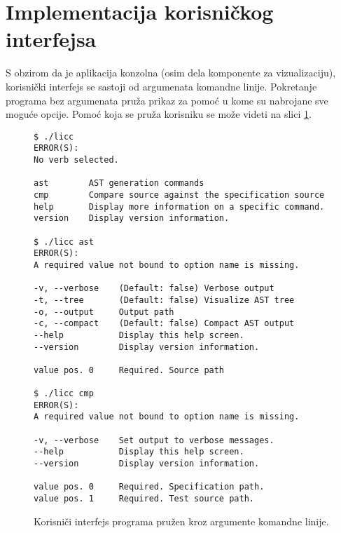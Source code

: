 \section{Implementacija korisničkog interfejsa}
\label{sec:ImplementationUI}

S obzirom da je aplikacija konzolna (osim dela komponente za vizualizaciju), korisnički interfejs se sastoji od argumenata komandne linije. Pokretanje programa bez argumenata pruža prikaz za pomoć u kome su nabrojane sve moguće opcije. Pomoć koja se pruža korisniku se može videti na slici \ref{fig:UIImpl}.

\begin{figure}[h!]
\centering
\begin{lstlisting}[language={}]
$ ./licc
ERROR(S):
No verb selected.

ast        AST generation commands
cmp        Compare source against the specification source
help       Display more information on a specific command.
version    Display version information.

$ ./licc ast
ERROR(S):
A required value not bound to option name is missing.

-v, --verbose    (Default: false) Verbose output
-t, --tree       (Default: false) Visualize AST tree
-o, --output     Output path
-c, --compact    (Default: false) Compact AST output
--help           Display this help screen.
--version        Display version information.

value pos. 0     Required. Source path

$ ./licc cmp
ERROR(S):
A required value not bound to option name is missing.

-v, --verbose    Set output to verbose messages.
--help           Display this help screen.
--version        Display version information.

value pos. 0     Required. Specification path.
value pos. 1     Required. Test source path.
\end{lstlisting}
\caption{Korisniči interfejs programa pružen kroz argumente komandne linije.}
\label{fig:UIImpl}
\end{figure}

